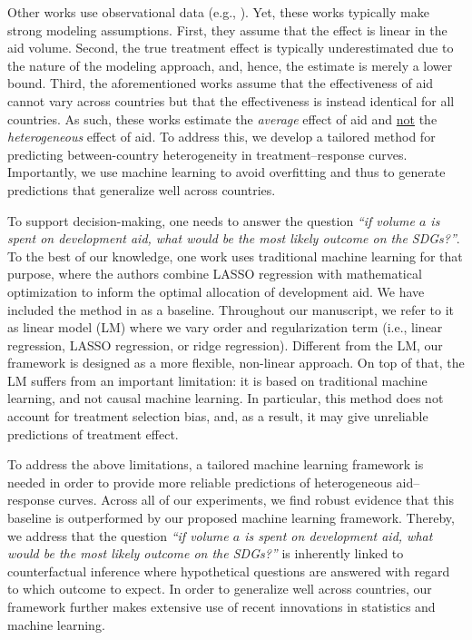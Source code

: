 \documentclass[sigconf]{acmart}
\begin{document}
Other works use observational data (e.g., \cite{Birchler2016,Munyanyi2020}). Yet, these works typically make strong modeling assumptions. First, they assume that the effect is linear in the aid volume. Second, the true treatment effect is typically underestimated due to the nature of the modeling approach, and, hence, the estimate is merely a lower bound. Third, the aforementioned works assume that the effectiveness of aid cannot vary across countries but that the effectiveness is instead identical for all countries. As such, these works estimate the \emph{average} effect of aid and \underline{not} the \emph{heterogeneous} effect of aid. To address this, we develop a tailored method for predicting between-country heterogeneity in treatment--response curves. Importantly, we use machine learning to avoid overfitting and thus to generate predictions that generalize well across countries.  

To support decision-making, one needs to answer the question \emph{``if volume $a$ is spent on development aid, what would be the most likely outcome on the SDGs?''}. To the best of our knowledge, one work \cite{Jakubik2022} uses traditional machine learning for that purpose, where the authors combine LASSO regression with mathematical optimization to inform the optimal allocation of development aid. We have included the method in \cite{Jakubik2022} as a baseline. Throughout our manuscript, we refer to it as linear model (LM) where we vary order and regularization term (i.e., linear regression, LASSO regression, or ridge regression). Different from the LM, our framework is designed as a more flexible, non-linear approach. On top of that, the LM suffers from an important limitation: it is based on traditional machine learning, and not causal machine learning. In particular, this method does not account for treatment selection bias, and, as a result, it may give unreliable predictions of treatment effect. %

To address the above limitations, a tailored machine learning framework is needed in order to provide more reliable predictions of heterogeneous aid--response curves. Across all of our experiments, we find robust evidence that this baseline is outperformed by our proposed machine learning framework. Thereby, we address that the question \emph{``if volume $a$ is spent on development aid, what would be the most likely outcome on the SDGs?''} is inherently linked to counterfactual inference where hypothetical questions are answered with regard to which outcome to expect. In order to generalize well across countries, our framework further makes extensive use of recent innovations in statistics and machine learning.   
\end{document}
